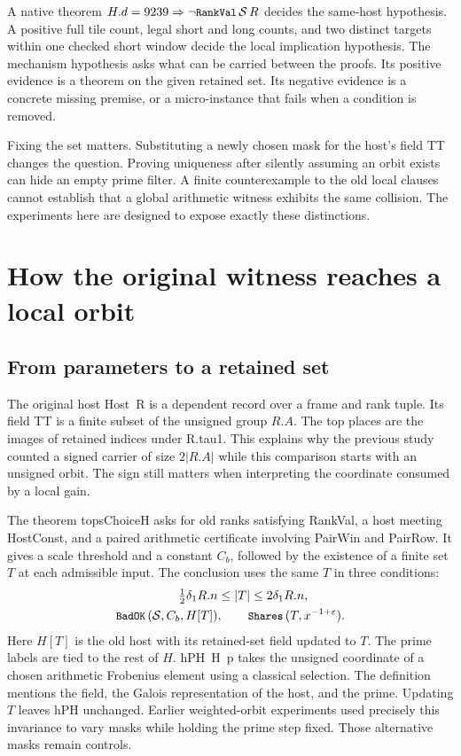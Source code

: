 \documentclass[12pt,letterpaper]{article}
\DeclareRobustCommand{\id}[1]{\mbox{\small\ttfamily #1}}
\begin{document}
A native theorem $H.d=9239\Rightarrow\neg\id{RankVal}\,\mathcal S\,R$ decides the same-host hypothesis. A positive full tile count, legal short and long counts, and two distinct targets within one checked short window decide the local implication hypothesis. The mechanism hypothesis asks what can be carried between the proofs. Its positive evidence is a theorem on the given retained set. Its negative evidence is a concrete missing premise, or a micro-instance that fails when a condition is removed.

Fixing the set matters. Substituting a newly chosen mask for the host's field \id{TT} changes the question. Proving uniqueness after silently assuming an orbit exists can hide an empty prime filter. A finite counterexample to the old local clauses cannot establish that a global arithmetic witness exhibits the same collision. The experiments here are designed to expose exactly these distinctions.

\section{How the original witness reaches a local orbit}

\subsection{From parameters to a retained set}

The original host \id{Host R} is a dependent record over a frame and rank tuple. Its field \id{TT} is a finite subset of the unsigned group $R.A$. The top places are the images of retained indices under \id{R.tau1}. This explains why the previous study counted a signed carrier of size $2|R.A|$ while this comparison starts with an unsigned orbit. The sign still matters when interpreting the coordinate consumed by a local gain.

The theorem \id{topsChoiceH} asks for old ranks satisfying \id{RankVal}, a host meeting \id{HostConst}, and a paired arithmetic certificate involving \id{PairWin} and \id{PairRow}. It gives a scale threshold and a constant $C_b$, followed by the existence of a finite set $T$ at each admissible input. The conclusion uses the same $T$ in three conditions:
\begin{align*}
  \tfrac12\delta_1 R.n &\le |T|\le 2\delta_1 R.n,\\
  \id{BadOK}\,(\mathcal S,C_b,H[T])&,\qquad
  \id{Shares}\,(T,x^{-1+\varepsilon}).
\end{align*}
Here $H[T]$ is the old host with its retained-set field updated to $T$. The prime labels are tied to the rest of $H$. \id{hPH H p} takes the unsigned coordinate of a chosen arithmetic Frobenius element using a classical selection. The definition mentions the field, the Galois representation of the host, and the prime. Updating $T$ leaves \id{hPH} unchanged. Earlier weighted-orbit experiments used precisely this invariance to vary masks while holding the prime step fixed. Those alternative masks remain controls.
\end{document}
